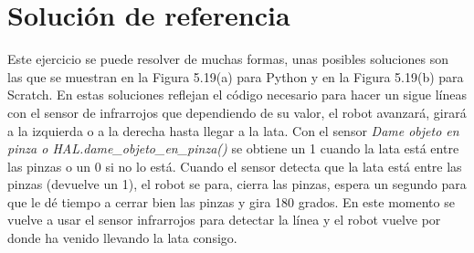 \section{Solución de referencia}
Este ejercicio se puede resolver de muchas formas, unas posibles soluciones son las que se muestran en la Figura 5.19(a) para Python y  en la Figura 5.19(b) para Scratch. 
En estas soluciones reflejan el código necesario para hacer un sigue líneas con el sensor de infrarrojos que dependiendo de su valor, el robot avanzará, girará a la izquierda o a la derecha hasta llegar a la lata. Con el sensor \textit{Dame objeto en pinza o HAL.dame\_objeto\_en\_pinza()} se obtiene un 1 cuando la lata está entre las pinzas o un 0 si no lo está. Cuando el sensor detecta que la lata está entre las pinzas (devuelve un 1), el robot se para, cierra las pinzas, espera un segundo para que le dé tiempo a cerrar bien las pinzas y gira 180 grados. En este momento se vuelve a usar el sensor infrarrojos para detectar la línea y el robot vuelve por donde ha venido llevando la lata consigo.

